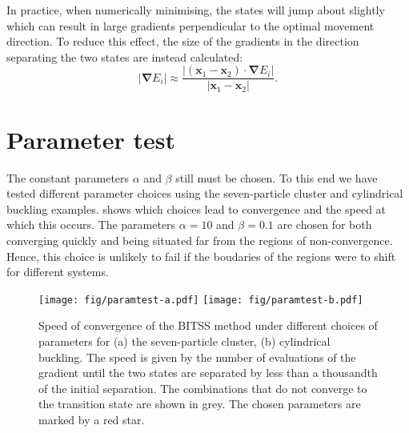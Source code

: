 \documentclass[aps,prl]{revtex4}
\newcommand{\abs}[1]{\left| #1 \right|}
\newcommand{\grad}[1]{\bm{\nabla} #1}
\begin{document}
In practice, when numerically minimising, the states will jump about slightly which can result in large gradients perpendicular to the optimal movement direction.
To reduce this effect, the size of the gradients in the direction separating the two states are instead calculated:
\begin{equation}
  \abs{\grad{E_i}} \approx \frac {\abs{(\bm{x}_1 - \bm{x}_2) \cdot \grad{E_i}}} {\abs{\bm{x}_1 - \bm{x}_2}}.
\end{equation}


\section{Parameter test}
The constant parameters $\alpha$ and $\beta$ still must be chosen.
To this end we have tested different parameter choices using the seven-particle cluster and cylindrical buckling examples.
 shows which choices lead to convergence and the speed at which this occurs.
The parameters $\alpha = 10$ and $\beta = 0.1$ are chosen for both converging quickly and being situated far from the regions of non-convergence.
Hence, this choice is unlikely to fail if the boudaries of the regions were to shift for different systems.

\begin{figure}
  \texttt{[image: fig/paramtest-a.pdf]}%
  \texttt{[image: fig/paramtest-b.pdf]}%
  \caption{\label{fig:paramtest}
    Speed of convergence of the BITSS method under different choices of parameters for (a) the seven-particle cluster, (b) cylindrical buckling.
    The speed is given by the number of evaluations of the gradient until the two states are separated by less than a thousandth of the initial separation.
    The combinations that do not converge to the transition state are shown in grey. 
    The chosen parameters are marked by a red star.
  }
\end{figure}
\end{document}

